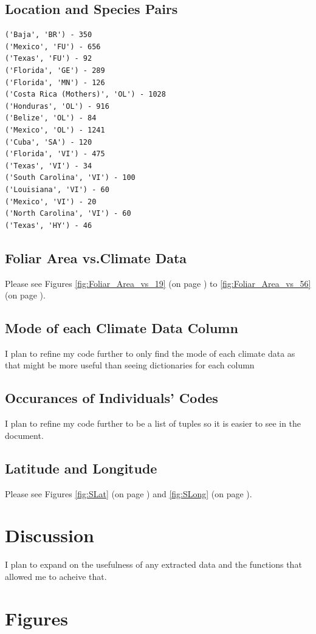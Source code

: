 \documentclass[letterpaper]{article}
\begin{document}
\subsection{Location and Species Pairs}
\begin{verbatim}
('Baja', 'BR') - 350
('Mexico', 'FU') - 656
('Texas', 'FU') - 92
('Florida', 'GE') - 289
('Florida', 'MN') - 126
('Costa Rica (Mothers)', 'OL') - 1028
('Honduras', 'OL') - 916
('Belize', 'OL') - 84
('Mexico', 'OL') - 1241
('Cuba', 'SA') - 120
('Florida', 'VI') - 475
('Texas', 'VI') - 34
('South Carolina', 'VI') - 100
('Louisiana', 'VI') - 60
('Mexico', 'VI') - 20
('North Carolina', 'VI') - 60
('Texas', 'HY') - 46
\end{verbatim}
\subsection{Foliar Area vs.Climate Data}
Please see Figures \ref{fig:Foliar_Area_vs_19} (on page \pageref{fig:Foliar_Area_vs_19}) to \ref{fig:Foliar_Area_vs_56} (on page \pageref{fig:Foliar_Area_vs_56}).
\subsection{Mode of each Climate Data Column}
I plan to refine my code further to only find the mode of each climate data as that might be more useful than seeing dictionaries for each column
\subsection{Occurances of Individuals' Codes}
I plan to refine my code further to be a list of tuples so it is easier to see in the document.
\subsection{Latitude and Longitude}
Please see Figures \ref{fig:SLat} (on page \pageref{fig:SLat}) and \ref{fig:SLong} (on page \pageref{fig:SLong}). 
\section{Discussion}
I plan to expand on the usefulness of any extracted data and the functions that allowed me to acheive that. 

\newpage




\newpage

\section*{Figures}
\end{document}
